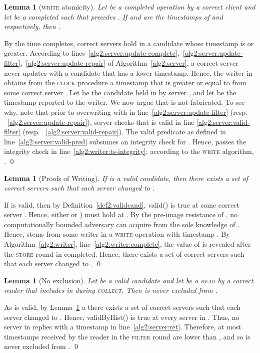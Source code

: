 \documentclass[10pt,conference,compsocconf]{IEEEtran}
\newtheorem{la}[defn]{Lemma}
\newenvironment{prooff}{\vspace{1ex}\noindent{\bf Proof:}\hspace{0.5em}}
	{\hfill\qed\vspace{1em}}
\begin{document}
\begin{la}[\textsc{write} atomicity]\label{la2:powr}
Let  be a completed operation by a correct client and let  be a completed  such that  precedes . If  and  are the timestamps of  and  respectively, then .
\end{la}
\begin{prooff} By the time  completes,  correct servers hold in  a candidate whose timestamp is  or greater. According to lines~\ref{alg2:server:update-complete},~\ref{alg2:server:update-filter},~\ref{alg2:server:update-repair} of Algorithm~\ref{alg2:server}, a correct server never updates  with a candidate that has a lower timestamp. Hence, the writer in  obtains from the \textsc{clock} procedure a timestamp that is greater or equal to  from some correct server . Let  be the candidate held in  by server , and let  be the timestamp reported to the writer. We now argue that  is not fabricated. To see why, note that prior to overwriting  with  in line~\ref{alg2:server:update-filter} (resp. ~\ref{alg2:server:update-repair}), server  checks that  is valid in line \ref{alg2:server:valid-filter} (resp. ~\ref{alg2:server:valid-repair}). The \textsf{valid} predicate as defined in line~\ref{alg2:server:valid-pred} subsumes an integrity check for . Hence,  passes the integrity check in line~\ref{alg2:writer:ts-integrity}; according to the \textsc{write} algorithm, .
\end{prooff}

\begin{la}[Proofs of Writing] \label{la2:pow}
If  is a valid candidate, then there exists a set  of  correct servers such that each server  changed  to .
\end{la}
\begin{prooff}
If  is valid, then by Definition~\ref{def2:validcand}, \textsf{valid}() is true at some correct server . Hence, either  or ) must hold at . By the pre-image resistance of , no computationally bounded adversary can acquire  from the sole knowledge of . Hence,  stems from some writer in a \textsc{write} operation  with timestamp . By Algorithm~\ref{alg2:writer}, line~\ref{alg2:writer:complete}, the value of  is revealed after the \textsc{store} round in  completed. Hence, there exists a set  of  correct servers such that each server  changed  to .
\end{prooff}

\begin{la}[No exclusion]\label{la2:noexclusion}
Let  be a valid candidate and let  be a \textsc{read} by a correct reader that includes  in  during \textsc{collect}. Then  is never excluded from .
\end{la}
\begin{prooff}
As  is valid, by Lemma~\ref{la2:pow} a there exists a set  of  correct servers such that each server  changed  to . Hence, \textsf{validByHist}() is true at every server in . Thus, no server in  replies with a timestamp  in line~\ref{alg2:server:ret}.
Therefore, at most  timestamps received by the reader in the \textsc{filter} round are lower than , and so  is never excluded from .
\end{prooff}
\end{document}
